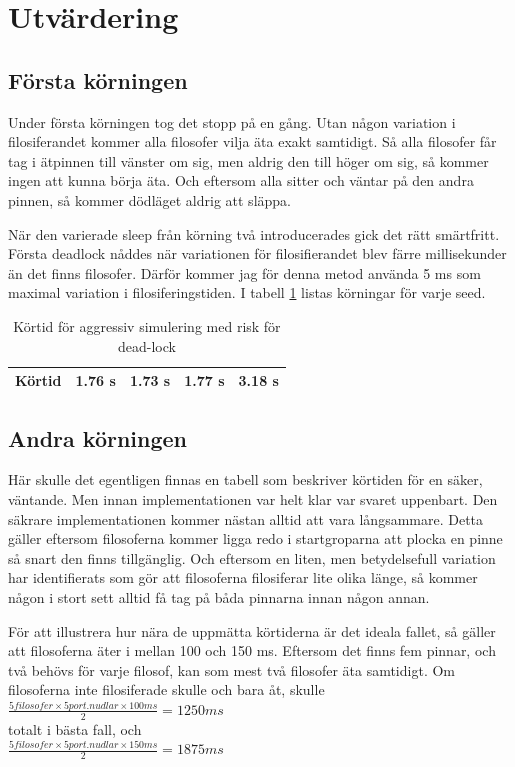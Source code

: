 \documentclass[a4paper, 11pt]{article}
\begin{document}
\section{Utvärdering}
\subsection{Första körningen}

Under första körningen tog det stopp på en gång. Utan någon variation i filosiferandet kommer alla filosofer
vilja äta exakt samtidigt. Så alla filosofer får tag i ätpinnen till vänster om sig, men aldrig den till höger om sig,
så kommer ingen att kunna börja äta. Och eftersom alla sitter och väntar på den andra pinnen, så kommer dödläget aldrig att
släppa.

När den varierade sleep från körning två introducerades gick det rätt smärtfritt. Första deadlock nåddes när
variationen för filosifierandet blev färre millisekunder än det finns filosofer. Därför kommer jag för denna
metod använda 5 ms som maximal variation i filosiferingstiden. I tabell \ref{tab:results1} listas körningar för varje seed.

\begin{table}[h]
\centering
\begin{tabular}{|l|r|r|r|r|}
\hline
Körtid & 1.76 s & 1.73 s & 1.77 s & 3.18 s \\
\hline
\end{tabular}
\caption{Körtid för aggressiv simulering med risk för dead-lock}
\label{tab:results1}
\end{table}

\subsection{Andra körningen}

Här skulle det egentligen finnas en tabell som beskriver körtiden för en säker, väntande. Men
innan implementationen var helt klar var svaret uppenbart. Den säkrare implementationen kommer
nästan alltid att vara långsammare. Detta gäller eftersom filosoferna kommer ligga redo i startgroparna
att plocka en pinne så snart den finns tillgänglig. Och eftersom en liten, men betydelsefull
variation har identifierats som gör att filosoferna filosiferar lite olika länge, så kommer någon i stort
sett alltid få tag på båda pinnarna innan någon annan.

För att illustrera hur nära de uppmätta körtiderna är det ideala fallet, så gäller att
filosoferna äter i mellan 100 och 150 ms. Eftersom det finns fem pinnar, och två behövs för varje filosof,
kan som mest två filosofer äta samtidigt. Om filosoferna inte filosiferade skulle och bara åt, skulle
$ \frac{5 filosofer \times 5 port. nudlar \times 100 ms}{2} = 1250 ms $ \\
totalt i bästa fall, och \\
$ \frac{5 filosofer \times 5 port. nudlar \times 150 ms}{2} = 1875 ms $ \\
\end{document}
